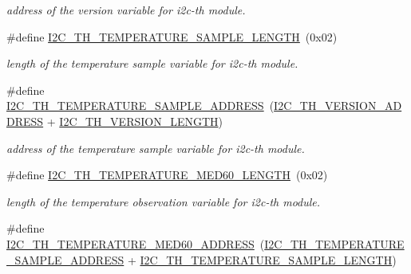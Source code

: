 \begin{DoxyCompactItemize}
\begin{DoxyCompactList}\small\item\em address of the version variable for i2c-\/th module. \end{DoxyCompactList}\item 
\mbox{\label{registers-th_8h_a68ba9de54f0dafd98abd7c087aea042f}} 
\#define \hyperlink{registers-th_8h_a68ba9de54f0dafd98abd7c087aea042f}{I2\+C\+\_\+\+T\+H\+\_\+\+T\+E\+M\+P\+E\+R\+A\+T\+U\+R\+E\+\_\+\+S\+A\+M\+P\+L\+E\+\_\+\+L\+E\+N\+G\+TH}~(0x02)
\begin{DoxyCompactList}\small\item\em length of the temperature sample variable for i2c-\/th module. \end{DoxyCompactList}\item 
\mbox{\label{registers-th_8h_a44805161261d958e1e20df79568953cc}} 
\#define \hyperlink{registers-th_8h_a44805161261d958e1e20df79568953cc}{I2\+C\+\_\+\+T\+H\+\_\+\+T\+E\+M\+P\+E\+R\+A\+T\+U\+R\+E\+\_\+\+S\+A\+M\+P\+L\+E\+\_\+\+A\+D\+D\+R\+E\+SS}~(\hyperlink{registers-th_8h_a264c5b05353c735ad1d5d91550b12cc7}{I2\+C\+\_\+\+T\+H\+\_\+\+V\+E\+R\+S\+I\+O\+N\+\_\+\+A\+D\+D\+R\+E\+SS} + \hyperlink{registers-th_8h_ae5c39794517db2f849788f74d0f5d71a}{I2\+C\+\_\+\+T\+H\+\_\+\+V\+E\+R\+S\+I\+O\+N\+\_\+\+L\+E\+N\+G\+TH})
\begin{DoxyCompactList}\small\item\em address of the temperature sample variable for i2c-\/th module. \end{DoxyCompactList}\item 
\mbox{\label{registers-th_8h_ac6f3b8ab3eade373310b50c2248bac95}} 
\#define \hyperlink{registers-th_8h_ac6f3b8ab3eade373310b50c2248bac95}{I2\+C\+\_\+\+T\+H\+\_\+\+T\+E\+M\+P\+E\+R\+A\+T\+U\+R\+E\+\_\+\+M\+E\+D60\+\_\+\+L\+E\+N\+G\+TH}~(0x02)
\begin{DoxyCompactList}\small\item\em length of the temperature observation variable for i2c-\/th module. \end{DoxyCompactList}\item 
\mbox{\label{registers-th_8h_a0defa72b89f6bbfe41feb464a1eb6c81}} 
\#define \hyperlink{registers-th_8h_a0defa72b89f6bbfe41feb464a1eb6c81}{I2\+C\+\_\+\+T\+H\+\_\+\+T\+E\+M\+P\+E\+R\+A\+T\+U\+R\+E\+\_\+\+M\+E\+D60\+\_\+\+A\+D\+D\+R\+E\+SS}~(\hyperlink{registers-th_8h_a44805161261d958e1e20df79568953cc}{I2\+C\+\_\+\+T\+H\+\_\+\+T\+E\+M\+P\+E\+R\+A\+T\+U\+R\+E\+\_\+\+S\+A\+M\+P\+L\+E\+\_\+\+A\+D\+D\+R\+E\+SS} + \hyperlink{registers-th_8h_a68ba9de54f0dafd98abd7c087aea042f}{I2\+C\+\_\+\+T\+H\+\_\+\+T\+E\+M\+P\+E\+R\+A\+T\+U\+R\+E\+\_\+\+S\+A\+M\+P\+L\+E\+\_\+\+L\+E\+N\+G\+TH})

\end{DoxyCompactItemize}
